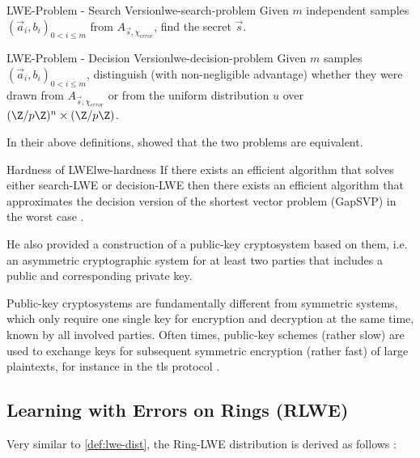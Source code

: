 \begin{definition}{LWE-Problem - Search Version}{lwe-search-problem}
  Given $m$ independent samples $(\vec{a}_i, b_i)_{0 < i \leq m}$ from $A_{\vec{s}, \chi_{error}}$, find the secret $\vec{s}$.
\end{definition}
\begin{definition}{LWE-Problem - Decision Version}{lwe-decision-problem}
  Given $m$ samples $(\vec{a}_i, b_i)_{0 < i \leq m}$, distinguish (with non-negligible advantage) whether they were drawn from $A_{\vec{s}, \chi_{error}}$ or from the uniform distribution $u$ over $(\Z / p \Z)^n \times (\Z / p \Z)$.
\end{definition}

In their above definitions, \citeauthor{2005-lwe-original} showed that the two problems are equivalent.

\begin{theorem}{Hardness of LWE}{lwe-hardness}
  If there exists an efficient algorithm that solves either search-LWE or decision-LWE then there exists an efficient algorithm that approximates the decision version of the shortest vector problem (GapSVP) in the worst case \parencite{2010-lwe-survey}.
\end{theorem}

He also provided a construction of a public-key cryptosystem based on them, i.e. an asymmetric cryptographic system for at least two parties that includes a public and corresponding private key.

Public-key cryptosystems are fundamentally different from symmetric systems, which only require one single key for encryption and decryption at the same time, known by all involved parties.
Often times, public-key schemes (rather slow) are used to exchange keys for subsequent symmetric encryption (rather fast) of large plaintexts, for instance in the \gls{tls} protocol \parencite{rfc8446}.

\subsection{Learning with Errors on Rings (RLWE)}
Very similar to \cref{def:lwe-dist}, the Ring-LWE distribution is derived as follows \parencite{2010-rlwe-original}:

